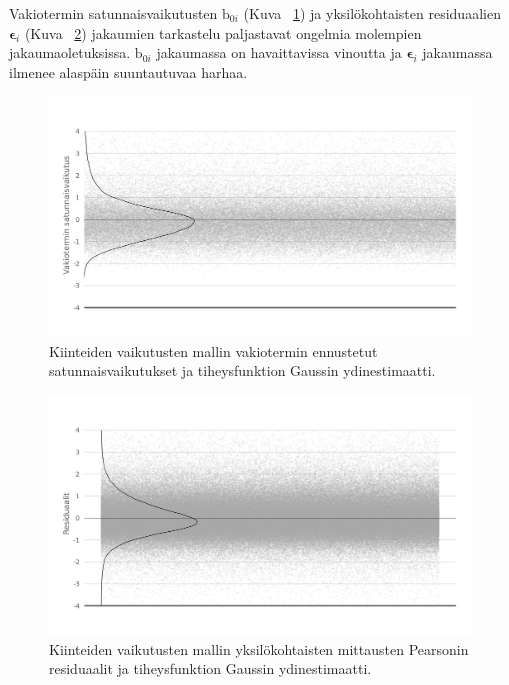 \documentclass[finnish]{docopts}
\begin{document}
Vakiotermin satunnaisvaikutusten $\text{b}_{0i}$ (Kuva ~\ref{fig:lme1_ranef}) ja yksilökohtaisten residuaalien $\bm{\epsilon}_i$ (Kuva ~\ref{fig:lme1_resid}) jakaumien tarkastelu paljastavat ongelmia molempien jakaumaoletuksissa. $\text{b}_{0i}$ jakaumassa on havaittavissa vinoutta ja $\bm{\epsilon}_i$ jakaumassa ilmenee alaspäin suuntautuvaa harhaa.\\

\begin{figure}[H]
\centering
  \includegraphics[scale=0.8]{kuvaajat/lme_satunnaisvaikutukset.png}
  \caption{Kiinteiden vaikutusten mallin vakiotermin ennustetut satunnaisvaikutukset ja tiheysfunktion Gaussin ydinestimaatti.}
  \label{fig:lme1_ranef}
\end{figure}

\begin{figure}[H]
\centering
  \includegraphics[scale=0.8]{kuvaajat/lme_residuaalit.png}
  \caption{Kiinteiden vaikutusten mallin yksilökohtaisten mittausten Pearsonin residuaalit ja tiheysfunktion Gaussin ydinestimaatti.}
  \label{fig:lme1_resid}
\end{figure}
\end{document}

